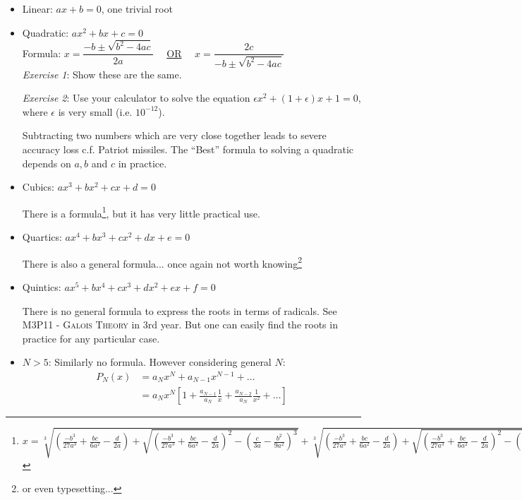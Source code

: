 \documentclass[twoside]{scrartcl}
\begin{document}
\begin{itemize}

\item Linear: $ax + b = 0$, one trivial root

\item Quadratic: $ax^2 + bx + c = 0$\\

Formula: $x = \dfrac{-b \pm \sqrt{b^2 - 4ac}}{2a} \quad$ \underline{OR} $\quad x = \dfrac{2c}{-b \pm \sqrt{b^2 - 4ac}}$\\


\emph{Exercise 1}: Show these are the same. 

\emph{Exercise 2}: Use your calculator to solve the equation $\epsilon x^2 + (1 + \epsilon)x + 1 = 0$, where $\epsilon$ is very small (i.e. $10^{-12}$).

Subtracting two numbers which are very close together leads to severe accuracy loss c.f. Patriot missiles. The ``Best'' formula to solving a quadratic depends on $a, b$ and $c$ in practice.

\item Cubics: $ax^3 + bx^2 + cx + d = 0$

There is a formula\footnote{\tiny $x = \sqrt[3]{\left(\frac{-b^3}{27a^3} + \frac{bc}{6a^2} - \frac{d}{2a}\right) + \sqrt{\left(\frac{-b^3}{27a^3} + \frac{bc}{6a^2}-\frac{d}{2a}\right)^2 - \left(\frac{c}{3a}-\frac{b^2}{9a^2}\right)^3}} + \sqrt[3]{\left(\frac{-b^3}{27a^3}+\frac{bc}{6a^2}-\frac{d}{2a}\right) + \sqrt{\left(\frac{-b^3}{27a^3}+\frac{bc}{6a^2}-\frac{d}{2a}\right)^2 - \left(\frac{c}{3a}-\frac{b^2}{9a^2}\right)^3}} - \frac{b}{3a}$\\},
 but it has very little practical use.\\

\item Quartics: $ax^4 + bx^3 + cx^2 + dx + e = 0$

There is also a general formula... once again not worth knowing\footnote{or even typesetting...}\\

\item Quintics: $ax^5 + bx^4 + cx^3 + dx^2 + ex + f = 0$

There is no general formula to express the roots in terms of radicals. See \textsc{M3P11 - Galois Theory} in 3rd year. But one can easily find the roots in practice for any particular case.\\

\item $N > 5$: Similarly no formula. However considering general $N$:
\begin{align*} \nonumber
P_N(x) &= a_Nx^N + a_{N-1}x^{N-1} + \dots\\ 
&= a_Nx^N\left[1 + \frac{a_{N-1}}{a_N} \frac{1}{x} + \frac{a_{N-2}}{a_N} \frac{1}{x^2} + \dots \right]
\end{align*}



\end{itemize}
\end{document}
